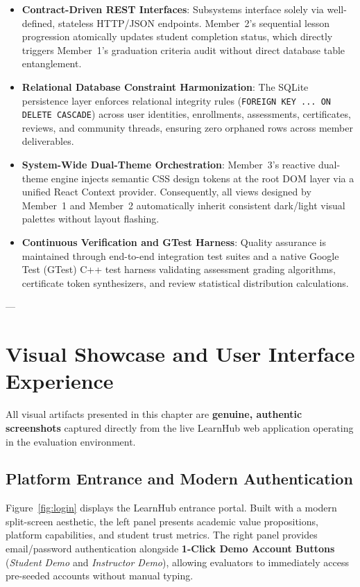 \documentclass[12pt,a4paper]{report}
\begin{document}
\begin{itemize}[itemsep=5pt]
    \item \textbf{Contract-Driven REST Interfaces}: Subsystems interface solely via well-defined, stateless HTTP/JSON endpoints. Member~2's sequential lesson progression atomically updates student completion status, which directly triggers Member~1's graduation criteria audit without direct database table entanglement.
    \item \textbf{Relational Database Constraint Harmonization}: The SQLite persistence layer enforces relational integrity rules (\texttt{FOREIGN KEY ... ON DELETE CASCADE}) across user identities, enrollments, assessments, certificates, reviews, and community threads, ensuring zero orphaned rows across member deliverables.
    \item \textbf{System-Wide Dual-Theme Orchestration}: Member~3's reactive dual-theme engine injects semantic CSS design tokens at the root DOM layer via a unified React Context provider. Consequently, all views designed by Member~1 and Member~2 automatically inherit consistent dark/light visual palettes without layout flashing.
    \item \textbf{Continuous Verification and GTest Harness}: Quality assurance is maintained through end-to-end integration test suites and a native Google Test (GTest) C++ test harness validating assessment grading algorithms, certificate token synthesizers, and review statistical distribution calculations.
\end{itemize}

---

\chapter{Visual Showcase and User Interface Experience}

All visual artifacts presented in this chapter are \textbf{genuine, authentic screenshots} captured directly from the live LearnHub web application operating in the evaluation environment.

\section{Platform Entrance and Modern Authentication}
Figure~\ref{fig:login} displays the LearnHub entrance portal. Built with a modern split-screen aesthetic, the left panel presents academic value propositions, platform capabilities, and student trust metrics. The right panel provides email/password authentication alongside \textbf{1-Click Demo Account Buttons} (\textit{Student Demo} and \textit{Instructor Demo}), allowing evaluators to immediately access pre-seeded accounts without manual typing.
\end{document}
